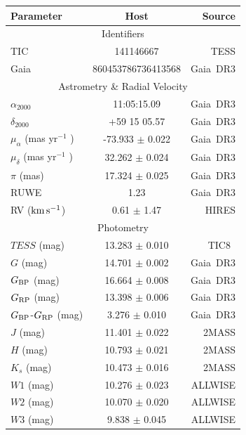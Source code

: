 \documentclass[11pt,twocolumn,tighten,linenumbers]{aastex7}
\newcommand{\kms}{\ensuremath{\rm km\,s^{-1}}}
\begin{document}
\begin{table}
    \centering
    \begin{tabular}{lcr}
    \hline 
    \hline
    Parameter & Host & Source \\
    \hline 
    \multicolumn{3}{c}{Identifiers} \\
    \hline
    TIC & 141146667 & TESS \\
    Gaia & 860453786736413568 & Gaia\ DR3 \\
    \hline
    \multicolumn{3}{c}{Astrometry \& Radial Velocity} \\ 
    \hline
    $\alpha_{2000}$ & 11:05:15.09   & Gaia\ DR3 \\
    $\delta_{2000}$ & +59 15 05.57  & Gaia\ DR3 \\
    $\mu_{\alpha}$ (mas yr$^{-1}$ ) & -73.933 $\pm$ 0.022 & Gaia\ DR3 \\
    $\mu_{\delta}$ (mas yr$^{-1}$ ) &  32.262 $\pm$ 0.024 & Gaia\ DR3 \\
    $\pi$ (mas)                     &  17.324 $\pm$ 0.025 & Gaia\ DR3 \\
    RUWE                            &  1.23               & Gaia\ DR3 \\
    RV (\kms)                       & 0.61 $\pm$ 1.47     & HIRES \\
    \hline
    \multicolumn{3}{c}{Photometry} \\
    \hline
    $TESS$ (mag)                    & 13.283 $\pm$ 0.010 & TIC8\     \\
    $G$ (mag)                       & 14.701 $\pm$ 0.002 & Gaia\ DR3 \\
    $G_{\rm BP}$ (mag)              & 16.664 $\pm$ 0.008 & Gaia\ DR3 \\
    $G_{\rm RP}$ (mag)              & 13.398 $\pm$ 0.006 & Gaia\ DR3 \\
    $G_{\rm BP}$-$G_{\rm RP}$ (mag) &  3.276 $\pm$ 0.010 & Gaia\ DR3 \\
    $J$ (mag)                       & 11.401 $\pm$ 0.022 & 2MASS     \\
    $H$ (mag)                       & 10.793 $\pm$ 0.021 & 2MASS     \\
    $K_s$ (mag)                     & 10.473 $\pm$ 0.016 & 2MASS     \\
    $W1$ (mag)                      & 10.276 $\pm$ 0.023 & ALLWISE   \\ %
    $W2$ (mag)                      & 10.070 $\pm$ 0.020 & ALLWISE   \\
    $W3$ (mag)                      &  9.838 $\pm$ 0.045 & ALLWISE   \\

\end{tabular}
\end{table}
\end{document}

